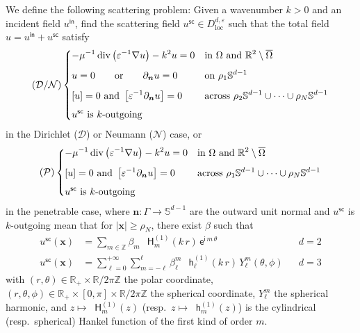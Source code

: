 \documentclass[12pt,a4paper]{article}
\newcommand{\bbR}{\mathbb{R}}
\newcommand{\bbS}{\mathbb{S}}
\newcommand{\bbZ}{\mathbb{Z}}
\newcommand{\calD}{\mathcal{D}}
\newcommand{\calN}{\mathcal{N}}
\newcommand{\calP}{\mathcal{P}}
\newcommand{\ex}{\mathsf{e}}
\newcommand{\im}{\mathsf{i}}
\newcommand{\Hu}{\mathop{}\!\mathsf{H}^{(1)}}
\newcommand{\hu}{\mathop{}\!\mathsf{h}^{(1)}}
\DeclareMathOperator{\Div}{div}
\newcommand{\plr}[1]{\left(#1\right)}
\newcommand{\clr}[1]{\left[#1\right]}
\newcommand{\vect}[1]{\boldsymbol{#1}}
\newcommand{\vx}{\boldsymbol{x}}
\newcommand{\eps}{\varepsilon}
\newcommand{\loc}{\mathrm{loc}}
\newcommand{\inc}{\mathsf{in}}
\newcommand{\sca}{\mathsf{sc}}
\begin{document}
We define the following scattering problem: Given a wavenumber $k > 0$ and an incident field $u^\inc$, find the scattering field $u^\sca \in D_\loc^{d, \eps}$ such that the total field $u = u^\inc + u^\sca$ satisfy
\begin{equation}\label{eq:scat_pde_im}
    (\calD / \calN)\begin{dcases}
        -\mu^{-1}\Div\plr{\eps^{-1} \nabla u} - k^2 u = 0 & \text{in } \Omega \text{ and } \bbR^2 \setminus \overline{\Omega}\\[1ex]
        u = 0 \qquad \text{or} \qquad \partial_{\vect{n}}u = 0 & \text{on } \rho_1\bbS^{d-1}\\[1ex]
        \clr{u} = 0 \ \text{and}\ \clr{\eps^{-1} \partial_{\vect{n}} u} = 0 & \text{across } \rho_2\bbS^{d-1} \cup \cdots \cup \rho_N\bbS^{d-1}\\[1ex]
        \text{$u^\sca$ is $k$-outgoing} 
    \end{dcases}
\end{equation}
in the Dirichlet ($\calD$) or Neumann ($\calN$) case, or
\begin{equation}\label{eq:scat_pde}
    (\calP)\begin{dcases}
        -\mu^{-1}\Div\plr{\eps^{-1} \nabla u} - k^2 u = 0 & \text{in } \Omega \text{ and } \bbR^2 \setminus \overline{\Omega}\\[1ex]
        \clr{u} = 0 \ \text{and}\ \clr{\eps^{-1} \partial_{\vect{n}} u} = 0 & \text{across } \rho_1\bbS^{d-1} \cup \cdots \cup \rho_N\bbS^{d-1}\\[1ex]
        \text{$u^\sca$ is $k$-outgoing} 
    \end{dcases}
\end{equation}
in the penetrable case, where $\vect{n} : \Gamma \to \bbS^{d-1}$ are the outward unit normal and $u^\sca$ is $k$-outgoing mean that for $|\vx| \ge \rho_N$, there exist $\beta$ such that
\begin{subequations}\label{eq:OWC}
\begin{align}
    u^\sca(\vx) &= \sum_{m \in \bbZ} \beta_m\, \Hu_m(k\, r)\, \ex^{\im\, m\, \theta} && d = 2\\
    u^\sca(\vx) &= \sum_{\ell = 0}^{+\infty} \sum_{m = -\ell}^\ell \beta_\ell^m\, \hu_\ell(k\, r)\, Y_\ell^m(\theta,\phi) && d = 3
\end{align}
\end{subequations}
with $(r, \theta) \in \bbR_+ \times \bbR / 2\pi\bbZ$ the polar coordinate, 
$(r, \theta, \phi) \in \bbR_+ \times [0, \pi] \times \bbR / 2\pi\bbZ$ the spherical coordinate, $Y_\ell^m$ the spherical harmonic, and $z \mapsto \Hu_m(z)$ (resp.\ $z \mapsto \hu_m(z)$) is the cylindrical (resp.\ spherical) Hankel function of the first kind of order $m$.
\end{document}
